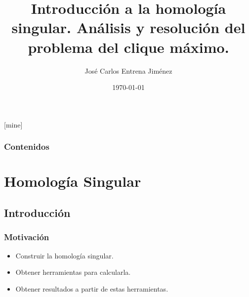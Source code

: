 \documentclass{beamer}
\title[Homología Singular. Problema del clíque máximo.]{Introducción a la homología singular. Análisis y resolución del problema del clique máximo.} %
\author{José Carlos Entrena Jiménez} %
\institute[UGR] %
{
  Universidad de Granada \\ %
  \medskip
  \textit{jentrena@correo.ugr.es} %
}
\date{\today} %
\begin{document}
[mine]

\frame{\titlepage}

\begin{frame}
  \frametitle{Contenidos} %
  \tableofcontents
\end{frame}



\section{Homología Singular} %

\subsection{Introducción} %


\begin{frame}
  \frametitle{Motivación}
  \begin{itemize}
    \item Construir la homología singular.
    \item Obtener herramientas para calcularla.
    \item Obtener resultados a partir de estas herramientas.
  \end{itemize}

\end{frame}
\end{document}
